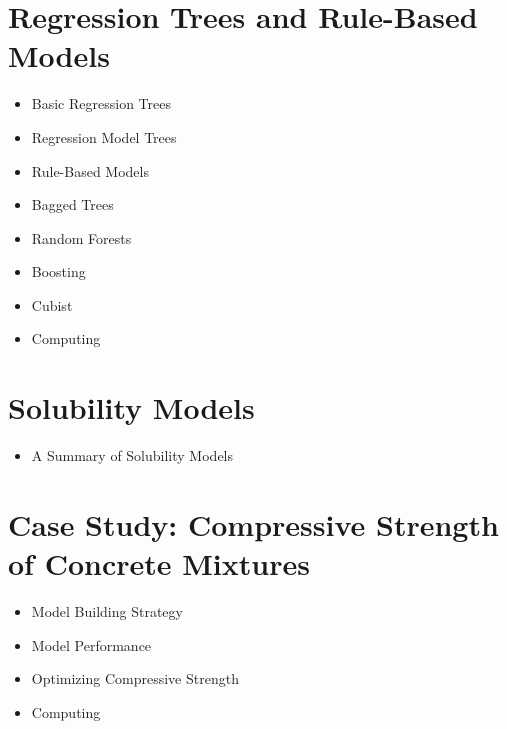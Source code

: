 \section{Regression Trees and Rule-Based Models} 
\begin{itemize} 
\item Basic Regression Trees 
\item Regression Model Trees 
\item Rule-Based Models  
\item Bagged Trees 
\item Random Forests 
\item Boosting  
\item Cubist 
\item Computing 
\end{itemize} 
\section{Solubility Models}
\begin{itemize} 
\item A Summary of Solubility Models 
\end{itemize}
\section{Case Study: Compressive Strength of Concrete
Mixtures}
\begin{itemize} 
\item Model Building Strategy 
\item Model Performance  
\item Optimizing Compressive Strength 
\item Computing 
\end{itemize} 
